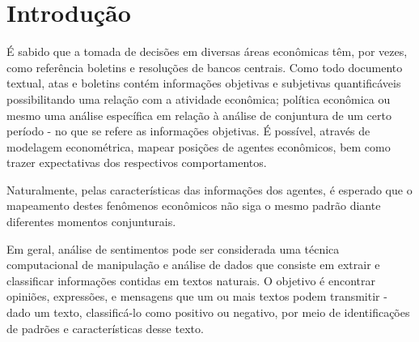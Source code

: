 \chapter{Introdução}




É sabido que a tomada de decisões em diversas áreas econômicas têm, por vezes, como referência boletins e resoluções de bancos centrais. Como todo documento textual, atas e boletins contém informações objetivas e subjetivas quantificáveis possibilitando uma relação com a atividade econômica; política econômica ou mesmo uma análise específica em relação à análise de conjuntura de um certo período - no que se refere as informações objetivas. É possível, através de modelagem econométrica, mapear posições de agentes econômicos, bem como trazer expectativas dos respectivos comportamentos.


Naturalmente, pelas características das informações dos agentes, é esperado que o mapeamento destes fenômenos econômicos não siga o mesmo padrão diante diferentes momentos conjunturais.  

Em geral, análise de sentimentos pode ser considerada uma técnica computacional de manipulação e análise de dados que consiste em extrair e classificar informações contidas em textos naturais. O objetivo é encontrar opiniões, expressões, e mensagens que um ou mais textos podem transmitir - dado um texto, classificá-lo como positivo ou negativo, por meio de identificações de padrões e características desse texto.   

